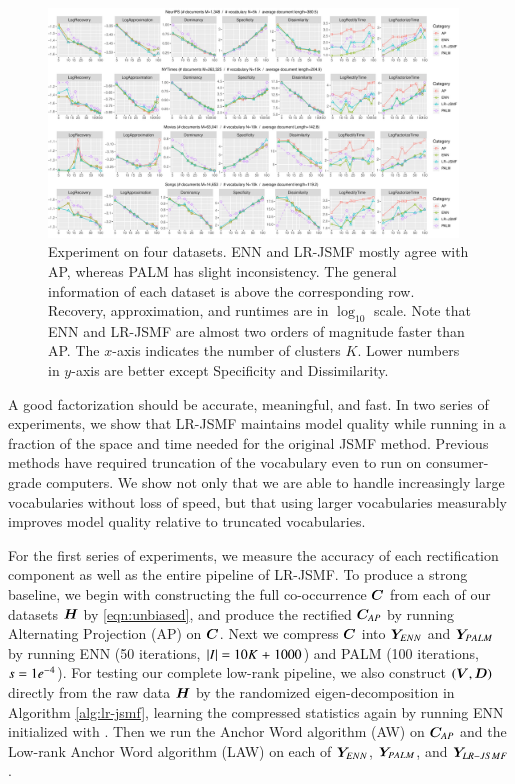 \begin{figure}[ht]
 	\centering
	\includegraphics[width=0.97\textwidth, trim={1.0cm 1.0cm 1.0cm 0.0cm}]
	{./lrtm/pics/real_MethodsPerTopics_new-plain.pdf}
	\caption{Experiment on four datasets. ENN and LR-JSMF mostly agree with AP,
	whereas PALM has slight inconsistency. The general information of each dataset
	is above the corresponding row. Recovery, approximation, and runtimes are in
	$\log_{10}$ scale. Note that ENN and LR-JSMF are almost two orders of
	magnitude faster than AP. The $x$-axis indicates the number of clusters $K$.
	Lower numbers in $y$-axis are better except Specificity and Dissimilarity.} 
	\label{fig:results-topics}
\end{figure}

A good factorization should be accurate, meaningful, and fast.
In two series of experiments, we show that LR-JSMF maintains model quality while
running in a fraction of the space and time needed for the original JSMF method.
Previous methods have required truncation of the vocabulary even to run on
consumer-grade computers. We show not only that we are able to handle
increasingly large vocabularies without loss of speed, but that using larger
vocabularies measurably improves model quality relative to truncated vocabularies.

For the first series of experiments, we measure the accuracy of each
rectification component as well as the entire pipeline of LR-JSMF. To produce a
strong baseline, we begin with constructing the full co-occurrence $\bm{C}$ from
each of our datasets $\bm{H}$ by \eqref{eqn:unbiased}, and produce the rectified
$\bm{C}_{AP}$ by running Alternating Projection (AP) on $\bm{C}$. Next we compress
$\bm{C}$ into $\bm{Y}_{ENN}$ and $\bm{Y}_{PALM}$ by running ENN (50 iterations, $|I|\mathrel{=}
10K \mathrel{+} 1000$) and PALM (100 iterations, $s\mathrel{=}1e^{-4}$). For testing our
complete low-rank pipeline, we also construct $(\bm{V}, \bm{D})$ directly from the raw
data $\bm{H}$ by the randomized eigen-decomposition in Algorithm \ref{alg:lr-jsmf},
learning the compressed statistics  again by running ENN
initialized with \smash{$\BV \sqrt{\BD}$}. Then we run the Anchor Word algorithm
(AW) on $\bm{C}_{AP}$ and the Low-rank Anchor Word algorithm (LAW) on each of $\bm{Y}_
{ENN}$, $\bm{Y}_{PALM}$, and $\bm{Y}_{LR-JSMF}$.

